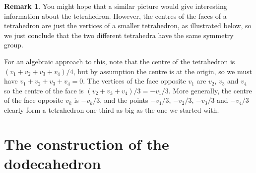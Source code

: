 \documentclass{amsart}
\newcommand{\blob}      {circle(0.03cm)}
\renewcommand{\:}{\colon}
\theoremstyle{definition}
\newtheorem{remark}[theorem]{Remark}
\begin{document}
\begin{remark}
 You might hope that a similar picture would give interesting
 information about the tetrahedron.  However, the centres of the faces
 of a tetrahedron are just the vertices of a smaller tetrahedron, as
 illustrated below, so we just conclude that the two different
 tetrahedra have the same symmetry group.
 \begin{center}
 \end{center}
 For an algebraic approach to this, note that the centre of the
 tetrahedron is $(v_1+v_2+v_3+v_4)/4$, but by assumption the centre is
 at the origin, so we must have $v_1+v_2+v_3+v_4=0$.  The vertices of
 the face opposite $v_1$ are $v_2$, $v_3$ and $v_4$ so the centre of
 the face is $(v_2+v_3+v_4)/3=-v_1/3$.  More generally, the centre of
 the face opposite $v_k$ is $-v_k/3$, and the points $-v_1/3$,
 $-v_2/3$, $-v_3/3$ and $-v_4/3$ clearly form a tetrahedron one third
 as big as the one we started with.
\end{remark}

\section{The construction of the dodecahedron}
\end{document}
